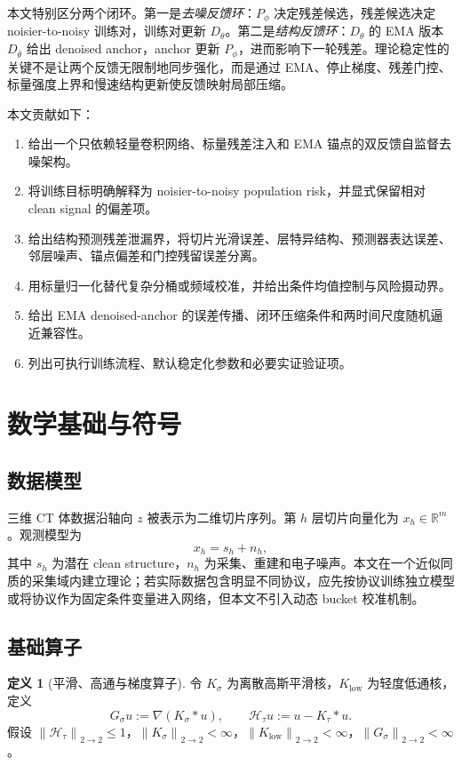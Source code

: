 \documentclass[11pt,a4paper,UTF8,fontset=fandol]{ctexart}
\theoremstyle{definition}
\newtheorem{definition}[theorem]{定义}
\newcommand{\norm}[1]{\left\lVert#1\right\rVert}
\newcommand{\R}{\mathbb{R}}
\newcommand{\cH}{\mathcal{H}}
\begin{document}
本文特别区分两个闭环。第一是\emph{去噪反馈环}：$P_\phi$ 决定残差候选，残差候选决定 noisier-to-noisy 训练对，训练对更新 $D_\theta$。第二是\emph{结构反馈环}：$D_\theta$ 的 EMA 版本 $D_{\bar\theta}$ 给出 denoised anchor，anchor 更新 $P_\phi$，进而影响下一轮残差。理论稳定性的关键不是让两个反馈无限制地同步强化，而是通过 EMA、停止梯度、残差门控、标量强度上界和慢速结构更新使反馈映射局部压缩。

本文贡献如下：
\begin{enumerate}[leftmargin=2em]
    \item 给出一个只依赖轻量卷积网络、标量残差注入和 EMA 锚点的双反馈自监督去噪架构。
    \item 将训练目标明确解释为 noisier-to-noisy population risk，并显式保留相对 clean signal 的偏差项。
    \item 给出结构预测残差泄漏界，将切片光滑误差、层特异结构、预测器表达误差、邻层噪声、锚点偏差和门控残留误差分离。
    \item 用标量归一化替代复杂分桶或频域校准，并给出条件均值控制与风险摄动界。
    \item 给出 EMA denoised-anchor 的误差传播、闭环压缩条件和两时间尺度随机逼近兼容性。
    \item 列出可执行训练流程、默认稳定化参数和必要实证验证项。
\end{enumerate}

\section{数学基础与符号}

\subsection{数据模型}

三维 CT 体数据沿轴向 $z$ 被表示为二维切片序列。第 $h$ 层切片向量化为 $x_h\in\R^m$。观测模型为
\begin{equation}
\label{eq:observation-model}
    x_h=s_h+n_h,
\end{equation}
其中 $s_h$ 为潜在 clean structure，$n_h$ 为采集、重建和电子噪声。本文在一个近似同质的采集域内建立理论；若实际数据包含明显不同协议，应先按协议训练独立模型或将协议作为固定条件变量进入网络，但本文不引入动态 bucket 校准机制。

\subsection{基础算子}

\begin{definition}[平滑、高通与梯度算子]
令 $K_\sigma$ 为离散高斯平滑核，$K_{\mathrm{low}}$ 为轻度低通核，定义
\begin{equation}
    G_\sigma u:=\nabla(K_\sigma*u),
    \qquad
    \cH_\tau u:=u-K_\tau*u.
\end{equation}
假设 $\norm{\cH_\tau}_{2\to2}\le1$，$\norm{K_\sigma}_{2\to2}<\infty$，$\norm{K_{\mathrm{low}}}_{2\to2}<\infty$，$\norm{G_\sigma}_{2\to2}<\infty$。
\end{definition}
\end{document}
